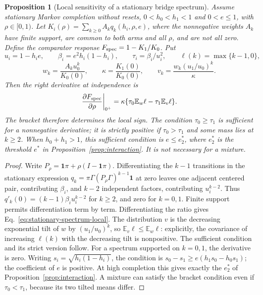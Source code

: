 \documentclass[11pt]{article}
\newtheorem{proposition}{Proposition}
\newcommand{\E}{\mathbb E}
\begin{document}
\begin{proposition}[Local sensitivity of a stationary bridge spectrum]
\label{prop:stationary-spectrum-local}
Assume stationary Markov completion without resets, $0<h_0<h_1<1$ and
$0<e\le1$, with $\rho\in[0,1)$. Let $K_i(\rho)=\sum_{k\ge0}A_kq_k(h_i,\rho,e)$, where the
nonnegative weights $A_k$ have finite support, are common to both arms and
all $\rho$, and are not all zero. Define the comparator response
$F_{\rm spec}=1-K_1/K_0$. Put
\[
u_i=1-h_ie,\qquad \beta_i=e^2h_i(1-h_i),\qquad
\tau_i=\beta_i/u_i^2,\qquad \ell(k)=\max\{k-1,0\},
\]
\[
w_k=\frac{A_ku_0^k}{K_0(0)},\qquad
\kappa=\frac{K_1(0)}{K_0(0)},\qquad
v_k=\frac{w_k(u_1/u_0)^k}{\kappa}.
\]
Then the right derivative at independence is
\begin{equation}\label{eq:stationary-spectrum-local}
\left.\frac{\partial F_{\rm spec}}{\partial\rho}\right|_{0^+}
=\kappa\{\tau_0\E_w\ell-\tau_1\E_v\ell\}.
\end{equation}
The bracket therefore determines the local sign. The condition
$\tau_0\ge\tau_1$ is sufficient for a nonnegative derivative; it is strictly
positive if $\tau_0>\tau_1$ and some mass lies at $k\ge2$. When $h_0+h_1>1$,
this sufficient condition is $e\le e_2^*$, where $e_2^*$ is the threshold
$e^*$ in Proposition~\ref{prop:interaction}. It is not necessary for a mixture.
\end{proposition}
\begin{proof}
Write $P_\rho=\boldsymbol1\pi+\rho(I-\boldsymbol1\pi)$. Differentiating the
$k-1$ transitions in the stationary expression
$q_k=\pi\Gamma(P_\rho\Gamma)^{k-1}\boldsymbol1$ at zero leaves one adjacent
centered pair, contributing $\beta_i$, and $k-2$ independent factors,
contributing $u_i^{k-2}$. Thus
$q'_k(0)=(k-1)\beta_i u_i^{k-2}$ for $k\ge2$, and zero for $k=0,1$.
Finite support permits differentiation term by term. Differentiating the
ratio gives Eq.~\eqref{eq:stationary-spectrum-local}. The distribution $v$
is the decreasing exponential tilt of $w$ by $(u_1/u_0)^k$, so
$\E_v\ell\le\E_w\ell$: explicitly, the covariance of increasing $\ell(k)$
with the decreasing tilt is nonpositive. The sufficient condition and its
strict version follow. For a spectrum supported on $k=0,1$, the derivative
is zero. Writing $s_i=\sqrt{h_i(1-h_i)}$, the condition is
$s_0-s_1\ge e(h_1s_0-h_0s_1)$; the coefficient of $e$ is positive.
At high completion this gives exactly the $e_2^*$ of
Proposition~\ref{prop:interaction}. A mixture can satisfy the bracket
condition even if $\tau_0<\tau_1$, because its two tilted means differ.
\end{proof}
\end{document}
